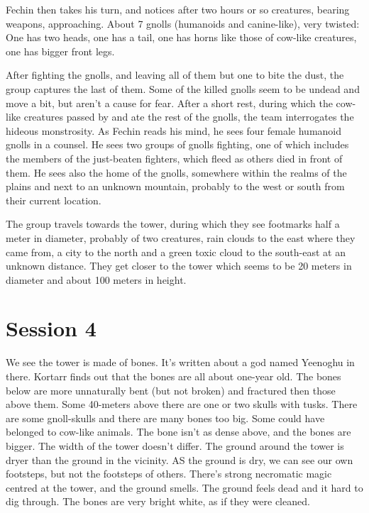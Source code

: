 \documentclass[10pt,a4paper,twoside,openany,hidelinks]{book}
\begin{document}
Fechin then takes his turn, and notices after two hours or so creatures, bearing weapons, approaching. About 7 gnolls (humanoids and canine-like), very twisted: One has two heads, one has a tail, one has horns like those of cow-like creatures, one has bigger front legs.

After fighting the gnolls, and leaving all of them but one to bite the dust, the group captures the last of them. Some of the killed gnolls seem to be undead and move a bit, but aren't a cause for fear. After a short rest, during which the cow-like creatures passed by and ate the rest of the gnolls, the team interrogates the hideous monstrosity. As Fechin reads his mind, he sees four female humanoid gnolls in a counsel. He sees two groups of gnolls fighting, one of which includes the members of the just-beaten fighters, which fleed as others died in front of them. He sees also the home of the gnolls, somewhere within the realms of the plains and next to an unknown mountain, probably to the west or south from their current location.

The group travels towards the tower, during which they see footmarks half a meter in diameter, probably of two creatures, rain clouds to the east where they came from, a city to the north and a green toxic cloud to the south-east at an unknown distance. They get closer to the tower which seems to be 20 meters in diameter and about 100 meters in height.

\chapter*{Session 4}

We see the tower is made of bones. It's written about a god named Yeenoghu in there.
Kortarr finds out that the bones are all about one-year old. The bones below are more unnaturally bent (but not broken) and fractured then those above them. Some 40-meters above there are one or two skulls with tusks.
There are some gnoll-skulls and there are many bones too big. Some could have belonged to cow-like animals.
The bone isn't as dense above, and the bones are bigger. The width of the tower doesn't differ.
The ground around the tower is dryer than the ground in the vicinity. AS the ground is dry, we can see our own footsteps, but not the footsteps of others. There's strong necromatic magic centred at the tower, and the ground smells. The ground feels dead and it hard to dig through.
The bones are very bright white, as if they were cleaned.
\end{document}
